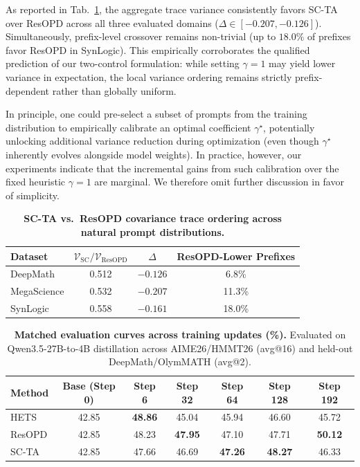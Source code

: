As reported in Tab.~\ref{tab:scta-cross-distribution}, the aggregate trace variance consistently favors SC-TA over ResOPD across all three evaluated domains ($\Delta \in [-0.207, -0.126]$). Simultaneously, prefix-level crossover remains non-trivial (up to $18.0\%$ of prefixes favor ResOPD in SynLogic). This empirically corroborates the qualified prediction of our two-control formulation: while setting $\gamma=1$ may yield lower variance in expectation, the local variance ordering remains strictly prefix-dependent rather than globally uniform.

In principle, one could pre-select a subset of prompts from the training distribution to empirically calibrate an optimal coefficient $\gamma^\star$, potentially unlocking additional variance reduction during optimization (even though $\gamma^\star$ inherently evolves alongside model weights). In practice, however, our experiments indicate that the incremental gains from such calibration over the fixed heuristic $\gamma=1$ are marginal. We therefore omit further discussion in favor of simplicity.

\begin{table}[t]
\caption{\textbf{SC-TA vs.\ ResOPD covariance trace ordering across natural prompt distributions.}}
\vspace{-2mm}
\label{tab:scta-cross-distribution}
\centering
\small
\setlength{\tabcolsep}{6.0pt}
\begin{tabular}{@{}lccc@{}}
\toprule
Dataset & $\mathcal{V}_{\mathrm{SC}} / \mathcal{V}_{\mathrm{ResOPD}}$ & $\Delta$ & ResOPD-Lower Prefixes \\
\midrule
DeepMath    & 0.512 & $-0.126$ & \phantom{0}6.8\% \\
MegaScience & 0.532 & $-0.207$ & 11.3\% \\
SynLogic    & 0.558 & $-0.161$ & 18.0\% \\
\bottomrule
\end{tabular}
\vspace{-2mm}
\end{table}

\begin{table}[t]
\caption{\textbf{Matched evaluation curves across training updates (\%).}
Evaluated on Qwen3.5-27B-to-4B distillation across AIME26/HMMT26 (avg@16) and held-out DeepMath/OlymMATH (avg@2).}
\vspace{-2mm}
\label{tab:scta-curve}
\centering
\small
\setlength{\tabcolsep}{5.5pt}
\begin{tabular}{@{}lcccccc@{}}
\toprule
Method & Base (Step 0) & Step 6 & Step 32 & Step 64 & Step 128 & Step 192 \\
\midrule
HETS  & 42.85 & \textbf{48.86} & 45.04 & 45.94 & 46.60 & 45.72 \\
ResOPD   & 42.85 & 48.23 & \textbf{47.95} & 47.10 & 47.71 & \textbf{50.12} \\
SC-TA & 42.85 & 47.66 & 46.69 & \textbf{47.26} & \textbf{48.27} & 46.33 \\
\bottomrule
\end{tabular}
\vspace{-4mm}
\end{table}


